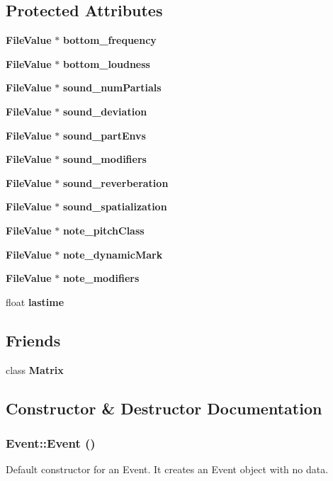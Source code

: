 \subsection*{Protected Attributes}
\begin{CompactItemize}
\item 
{\bf File\-Value} $\ast$ {\bf bottom\_\-frequency}
\item 
{\bf File\-Value} $\ast$ {\bf bottom\_\-loudness}
\item 
{\bf File\-Value} $\ast$ {\bf sound\_\-num\-Partials}
\item 
{\bf File\-Value} $\ast$ {\bf sound\_\-deviation}
\item 
{\bf File\-Value} $\ast$ {\bf sound\_\-part\-Envs}
\item 
{\bf File\-Value} $\ast$ {\bf sound\_\-modifiers}
\item 
{\bf File\-Value} $\ast$ {\bf sound\_\-reverberation}
\item 
{\bf File\-Value} $\ast$ {\bf sound\_\-spatialization}
\item 
{\bf File\-Value} $\ast$ {\bf note\_\-pitch\-Class}
\item 
{\bf File\-Value} $\ast$ {\bf note\_\-dynamic\-Mark}
\item 
{\bf File\-Value} $\ast$ {\bf note\_\-modifiers}
\item 
float {\bf lastime}
\end{CompactItemize}
\subsection*{Friends}
\begin{CompactItemize}
\item 
class {\bf Matrix}
\end{CompactItemize}


\subsection{Constructor \& Destructor Documentation}
\subsubsection{\setlength{\rightskip}{0pt plus 5cm}Event::Event ()\hspace{0.3cm}{\tt  [inline]}}\label{classEvent_a0}


Default constructor for an Event. It creates an Event object with no data. 

